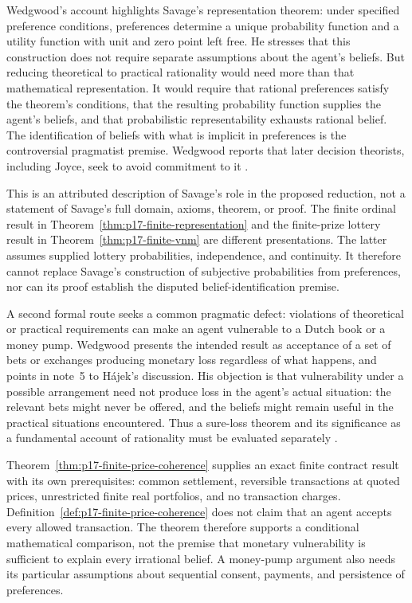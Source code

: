 Wedgwood's account highlights Savage's representation theorem: under
specified preference conditions, preferences determine a unique
probability function and a utility function with unit and zero point left
free. He stresses that this construction does not require separate
assumptions about the agent's beliefs. But reducing theoretical to practical
rationality would need more than that mathematical representation. It
would require that rational preferences satisfy the theorem's conditions,
that the resulting probability function supplies the agent's beliefs,
and that probabilistic representability exhausts rational belief. The
identification of beliefs with what is implicit in preferences is the
controversial pragmatist premise. Wedgwood reports that later decision
theorists, including Joyce, seek to avoid commitment to it
\parencite[pp.~140--141]{RalphWedgwood2021}.

This is an attributed description of Savage's role in the proposed
reduction, not a statement of Savage's full domain, axioms, theorem, or
proof. The finite ordinal result in
Theorem~\ref{thm:p17-finite-representation} and the finite-prize lottery
result in Theorem~\ref{thm:p17-finite-vnm} are different presentations.
The latter assumes supplied lottery probabilities, independence, and
continuity. It therefore cannot replace Savage's construction of
subjective probabilities from preferences, nor can its proof establish
the disputed belief-identification premise.

A second formal route seeks a common pragmatic defect: violations of
theoretical or practical requirements can make an agent vulnerable to
a Dutch book or a money pump. Wedgwood presents the intended result as
acceptance of a set of bets or exchanges producing monetary loss regardless
of what happens, and points in note~5 to H\'ajek's discussion. His objection
is that vulnerability under a possible arrangement need not produce loss
in the agent's actual situation: the relevant bets might never be offered,
and the beliefs might remain useful in the practical situations encountered.
Thus a sure-loss theorem and its significance as a fundamental account of
rationality must be evaluated separately
\parencite[p.~141 and p.~144, n.~5]{RalphWedgwood2021}.

Theorem~\ref{thm:p17-finite-price-coherence} supplies an exact finite
contract result with its own prerequisites: common settlement, reversible
transactions at quoted prices, unrestricted finite real portfolios, and
no transaction charges. Definition~\ref{def:p17-finite-price-coherence}
does not claim that an agent accepts every allowed transaction. The theorem
therefore supports a conditional mathematical comparison, not the premise
that monetary vulnerability is sufficient to explain every irrational
belief. A money-pump argument also needs its particular assumptions about
sequential consent, payments, and persistence of preferences.

